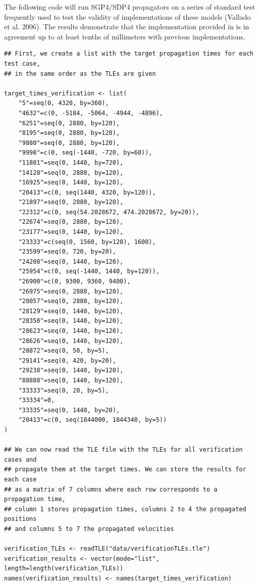 The following code will run SGP4/SDP4 propagators on a series of standard test frequently used to test the validity of implementations of these models (Vallado et al. 2006). The results demonstrate that the implementation provided in  is in agreement up to at least tenths of millimeters with previous implementations.

\begin{verbatim}
## First, we create a list with the target propagation times for each test case,
## in the same order as the TLEs are given

target_times_verification <- list(
    "5"=seq(0, 4320, by=360),
    "4632"=c(0, -5184, -5064, -4944, -4896),
    "6251"=seq(0, 2880, by=120),
    "8195"=seq(0, 2880, by=120),
    "9880"=seq(0, 2880, by=120),
    "9998"=c(0, seq(-1440, -720, by=60)),
    "11801"=seq(0, 1440, by=720),
    "14128"=seq(0, 2880, by=120),
    "16925"=seq(0, 1440, by=120),
    "20413"=c(0, seq(1440, 4320, by=120)),
    "21897"=seq(0, 2880, by=120),
    "22312"=c(0, seq(54.2028672, 474.2028672, by=20)),
    "22674"=seq(0, 2880, by=120),
    "23177"=seq(0, 1440, by=120),
    "23333"=c(seq(0, 1560, by=120), 1600),
    "23599"=seq(0, 720, by=20),
    "24208"=seq(0, 1440, by=120),
    "25954"=c(0, seq(-1440, 1440, by=120)),
    "26900"=c(0, 9300, 9360, 9400),
    "26975"=seq(0, 2880, by=120),
    "28057"=seq(0, 2880, by=120),
    "28129"=seq(0, 1440, by=120),
    "28350"=seq(0, 1440, by=120),
    "28623"=seq(0, 1440, by=120),
    "28626"=seq(0, 1440, by=120),
    "28872"=seq(0, 50, by=5),
    "29141"=seq(0, 420, by=20),
    "29238"=seq(0, 1440, by=120),
    "88888"=seq(0, 1440, by=120),
    "33333"=seq(0, 20, by=5),
    "33334"=0,
    "33335"=seq(0, 1440, by=20),
    "20413"=c(0, seq(1844000, 1844340, by=5))
)

## We can now read the TLE file with the TLEs for all verification cases and
## propagate them at the target times. We can store the results for each case
## as a matrix of 7 columns where each row corresponds to a propagation time,
## column 1 stores propagation times, columns 2 to 4 the propagated positions
## and columns 5 to 7 the propagated velocities

verification_TLEs <- readTLE("data/verificationTLEs.tle")
verification_results <- vector(mode="list", length=length(verification_TLEs))
names(verification_results) <- names(target_times_verification)


\end{verbatim}
